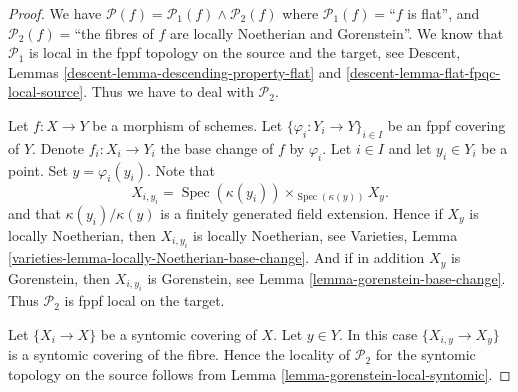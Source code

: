 \documentclass[10pt,a4paper]{amsart}
\theoremstyle{plain}
\theoremstyle{definition}
\theoremstyle{remark}
\numberwithin{equation}{subsection}
\def\Spec{\mathop{\mathrm{Spec}}}
\begin{document}
\begin{proof}
We have
$\mathcal{P}(f) =
\mathcal{P}_1(f) \wedge \mathcal{P}_2(f)$
where
$\mathcal{P}_1(f)=$``$f$ is flat'', and
$\mathcal{P}_2(f)=$``the fibres of $f$ are locally Noetherian
and Gorenstein''.
We know that $\mathcal{P}_1$ is
local in the fppf topology on the source and the target, see
Descent, Lemmas \ref{descent-lemma-descending-property-flat} and
\ref{descent-lemma-flat-fpqc-local-source}. Thus we have to deal
with $\mathcal{P}_2$.

\medskip\noindent
Let $f : X \to Y$ be a morphism of schemes.
Let $\{\varphi_i : Y_i \to Y\}_{i \in I}$ be an fppf covering of $Y$.
Denote $f_i : X_i \to Y_i$ the base change of $f$ by $\varphi_i$.
Let $i \in I$ and let $y_i \in Y_i$ be a point.
Set $y = \varphi_i(y_i)$. Note that
$$
X_{i, y_i} = \Spec(\kappa(y_i)) \times_{\Spec(\kappa(y))} X_y.
$$
and that $\kappa(y_i)/\kappa(y)$ is a finitely generated field
extension. Hence if $X_y$ is locally Noetherian, then
$X_{i, y_i}$ is locally Noetherian, see
Varieties, Lemma \ref{varieties-lemma-locally-Noetherian-base-change}.
And if in addition $X_y$ is Gorenstein,
then $X_{i, y_i}$ is Gorenstein, see
Lemma \ref{lemma-gorenstein-base-change}.
Thus $\mathcal{P}_2$ is fppf local on the target.

\medskip\noindent
Let $\{X_i \to X\}$ be a syntomic covering of $X$.
Let $y \in Y$. In this case $\{X_{i, y} \to X_y\}$ is a
syntomic covering of the fibre. Hence the locality of $\mathcal{P}_2$
for the syntomic topology on the source follows from
Lemma \ref{lemma-gorenstein-local-syntomic}.
\end{proof}
\end{document}
